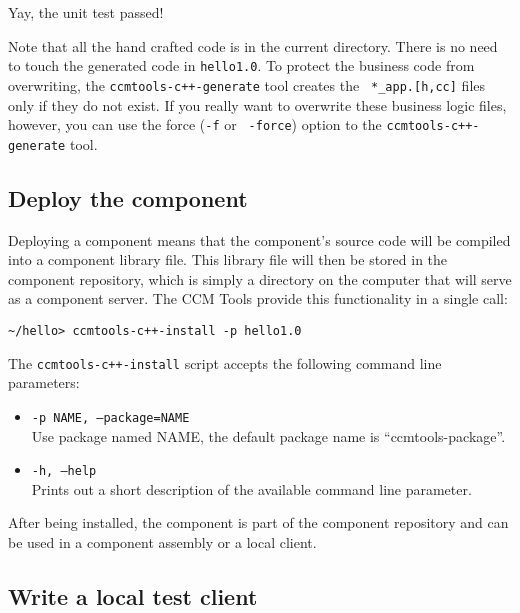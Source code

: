 Yay, the unit test passed!

Note that all the hand crafted code is in the current directory. There is no
need to touch the generated code in {\tt hello1.0}. To protect the business code
from overwriting, the {\tt ccmtools-c++-generate} tool creates the {\tt
*\_app.[h,cc]} files only if they do not exist. If you really want to overwrite
these business logic files, however, you can use the force ({\tt -f} or {\tt
-\-force}) option to the {\tt ccmtools-c++-generate} tool.

\subsection{Deploy the component}

Deploying a component means that the component's source code will be compiled
into a component library file. This library file will then be stored in the
component repository, which is simply a directory on the computer that will
serve as a component server. The CCM Tools provide this functionality in a
single call:
\begin{small}
\begin{verbatim}
~/hello> ccmtools-c++-install -p hello1.0
\end{verbatim}
\end{small}

The {\tt ccmtools-c++-install} script accepts the following command line
parameters:
\begin{itemize}
\item {\tt -p NAME, --package=NAME}\\
Use package named NAME, the default package name is ``ccmtools-package''.

\item {\tt -h, --help}\\
Prints out a short description of the available command line parameter.
\end{itemize}

After being installed, the component is part of the component repository and can
be used in a component assembly or a local client.

\subsection{Write a local test client}

